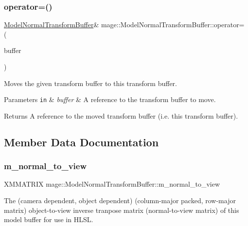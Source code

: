 \subsubsection{\texorpdfstring{operator=()}{operator=()}\hspace{0.1cm}{\footnotesize\ttfamily [2/2]}}
{\footnotesize\ttfamily \hyperlink{structmage_1_1_model_normal_transform_buffer}{Model\+Normal\+Transform\+Buffer}\& mage\+::\+Model\+Normal\+Transform\+Buffer\+::operator= (\begin{DoxyParamCaption}\item[{\hyperlink{structmage_1_1_model_normal_transform_buffer}{Model\+Normal\+Transform\+Buffer} \&\&}]{buffer }\end{DoxyParamCaption})\hspace{0.3cm}{\ttfamily [default]}}

Moves the given transform buffer to this transform buffer.


\begin{DoxyParams}[1]{Parameters}
\mbox{\tt in}  & {\em buffer} & A reference to the transform buffer to move. \\
\hline
\end{DoxyParams}
\begin{DoxyReturn}{Returns}
A reference to the moved transform buffer (i.\+e. this transform buffer). 
\end{DoxyReturn}


\subsection{Member Data Documentation}
\hypertarget{structmage_1_1_model_normal_transform_buffer_a1d79f8570b8bc020406e007f30bcfb13}{}\label{structmage_1_1_model_normal_transform_buffer_a1d79f8570b8bc020406e007f30bcfb13} 
\subsubsection{\texorpdfstring{m\+\_\+normal\+\_\+to\+\_\+view}{m\_normal\_to\_view}}
{\footnotesize\ttfamily X\+M\+M\+A\+T\+R\+IX mage\+::\+Model\+Normal\+Transform\+Buffer\+::m\+\_\+normal\+\_\+to\+\_\+view}

The (camera dependent, object dependent) (column-\/major packed, row-\/major matrix) object-\/to-\/view inverse tranpose matrix (normal-\/to-\/view matrix) of this model buffer for use in H\+L\+SL. \hypertarget{structmage_1_1_model_normal_transform_buffer_afd0823b56d399f56245a5e652b25e6d5}{}\label{structmage_1_1_model_normal_transform_buffer_afd0823b56d399f56245a5e652b25e6d5} 
